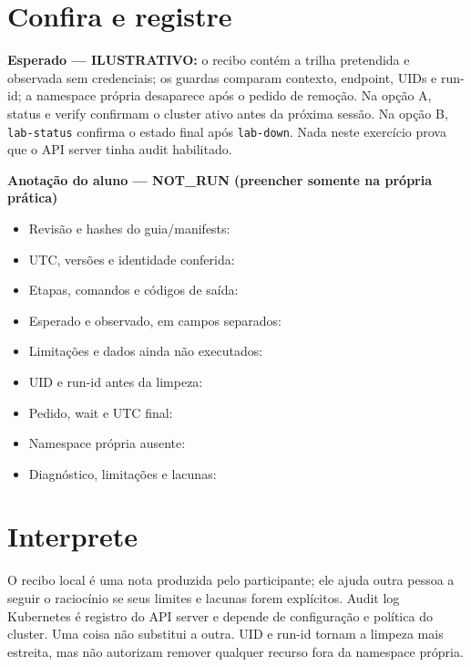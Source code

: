 \documentclass[12pt,openany,oneside,a4paper,chapter=TITLE,english,brazil]{abntex2}
\providecommand{\tightlist}{\setlength{\itemsep}{0pt}\setlength{\parskip}{0pt}}
\begin{document}
\section*{Confira e registre}\label{confira-e-registre-5}

\textbf{Esperado --- ILUSTRATIVO:} o recibo contém a trilha pretendida e observada sem credenciais; os guardas comparam contexto, endpoint, UIDs e run-id; a namespace própria desaparece após o pedido de remoção. Na opção A, status e verify confirmam o cluster ativo antes da próxima sessão. Na opção B, \texttt{lab-{}\allowbreak{}status} confirma o estado final após \texttt{lab-{}\allowbreak{}down}. Nada neste exercício prova que o API server tinha audit habilitado.

\textbf{Anotação do aluno --- NOT\_RUN (preencher somente na própria prática)}

\begin{itemize}
\tightlist
\item
  Revisão e hashes do guia/manifests: \hrulefill
\item
  UTC, versões e identidade conferida: \hrulefill
\item
  Etapas, comandos e códigos de saída: \hrulefill
\item
  Esperado e observado, em campos separados: \hrulefill
\item
  Limitações e dados ainda não executados: \hrulefill
\item
  UID e run-id antes da limpeza: \hrulefill
\item
  Pedido, wait e UTC final: \hrulefill
\item
  Namespace própria ausente: \hrulefill
\item
  Diagnóstico, limitações e lacunas: \hrulefill
\end{itemize}

\section*{Interprete}\label{interprete-5}

O recibo local é uma nota produzida pelo participante; ele ajuda outra pessoa a seguir o raciocínio se seus limites e lacunas forem explícitos. Audit log Kubernetes é registro do API server e depende de configuração e política do cluster. Uma coisa não substitui a outra. UID e run-id tornam a limpeza mais estreita, mas não autorizam remover qualquer recurso fora da namespace própria.
\end{document}

